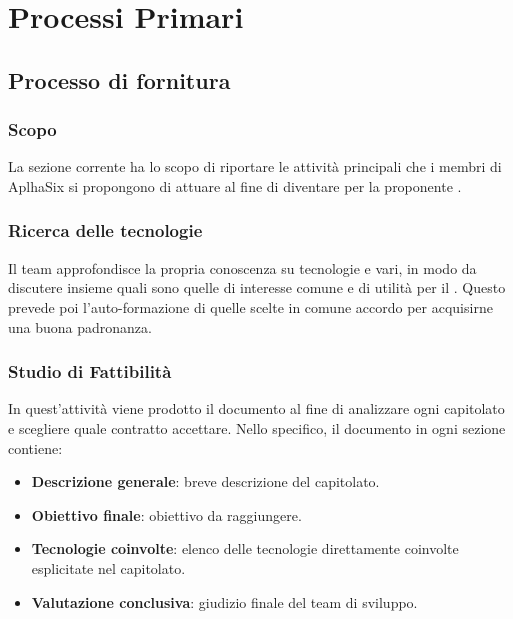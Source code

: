\section{Processi Primari}\label{PP}

    \subsection{Processo di fornitura}\label{PP:Fornitura}	%

        \subsubsection{Scopo}\label{PP:Fornitura:Scopo}
		La sezione corrente ha lo scopo di riportare le  attività principali che i membri di AplhaSix si propongono di attuare al fine di diventare  per la proponente \II.

		\subsubsection{Ricerca delle tecnologie}
		Il team approfondisce la propria conoscenza su tecnologie e  vari, in modo da discutere insieme quali sono
		quelle di interesse comune e di utilità per il . Questo prevede poi l'auto-formazione di quelle scelte in comune accordo per acquisirne una buona padronanza.

        \subsubsection{Studio di Fattibilità}\label{PP:Fornitura:SdF}
        In quest'attività viene prodotto il documento \Doc{\SdFv} al fine di analizzare ogni capitolato e scegliere quale contratto accettare.
        Nello specifico, il documento in ogni sezione contiene:
        	\begin{itemize}
        		\item \textbf{Descrizione generale}: breve descrizione del capitolato.
        		\item \textbf{Obiettivo finale}: obiettivo da raggiungere.
        		\item \textbf{Tecnologie coinvolte}: elenco delle tecnologie direttamente coinvolte esplicitate nel capitolato.
        		\item \textbf{Valutazione conclusiva}: giudizio finale del team di sviluppo.
        	\end{itemize}

